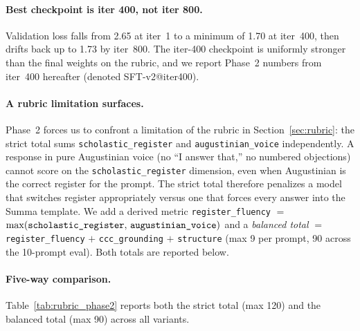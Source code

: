 \paragraph{Best checkpoint is iter 400, not iter 800.}
Validation loss falls from 2.65 at iter~1 to a minimum of 1.70 at
iter~400, then drifts back up to 1.73 by iter~800. The iter-400
checkpoint is uniformly stronger than the final weights on the rubric,
and we report Phase~2 numbers from iter~400 hereafter (denoted
SFT-v2@iter400).

\paragraph{A rubric limitation surfaces.}
Phase~2 forces us to confront a limitation of the rubric in
Section~\ref{sec:rubric}: the strict total sums
\texttt{scholastic\_register} and \texttt{augustinian\_voice}
independently. A response in pure Augustinian voice (no ``I answer
that,'' no numbered objections) cannot score on the
\texttt{scholastic\_register} dimension, even when Augustinian is the
correct register for the prompt. The strict total therefore penalizes
a model that switches register appropriately versus one that forces
every answer into the Summa template. We add a derived metric
\texttt{register\_fluency} $\!=$ $\max(\text{\texttt{scholastic\_register}},\,\text{\texttt{augustinian\_voice}})$
and a \emph{balanced total} $=$ \texttt{register\_fluency} $+$
\texttt{ccc\_grounding} $+$ \texttt{structure} (max 9 per prompt, 90
across the 10-prompt eval). Both totals are reported below.

\paragraph{Five-way comparison.}
Table~\ref{tab:rubric_phase2} reports both the strict total (max 120)
and the balanced total (max 90) across all variants.

